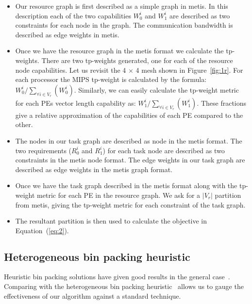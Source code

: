 \begin{itemize}

\item Our resource graph is first described as a simple graph in
  metis. In this description each of the two capabilities $W^i_0$ and
  $W^i_1$ are described as two constraints for each node in the
  graph. The communication bandwidth is described as edge weights in
  metis.

\item Once we have the resource graph in the metis format we calculate
  the tp-weights. There are two tp-weights generated, one for each of
  the resource node capabilities. Let us revisit the 4 $\times$ 4 mesh
  shown in Figure~\ref{fig:1r}. For each processor the MIPS tp-weight is
  calculated by the formula: $W^i_0/\sum_{\forall i \in
    V_r}(W^i_0)$. Similarly, we can easily calculate the tp-weight
  metric for each PEs vector length capability as: $W^i_1/\sum_{\forall
    i \in V_r}(W^i_1)$. These fractions give a relative approximation of
  the capabilities of each PE compared to the other.

\item The nodes in our task graph are described as node in the metis
  format. The two requirements ($R^i_0$ and $R^i_1$) for each task node
  are described as two constraints in the metis node format. The edge
  weights in our task graph are described as edge weights in the metis
  graph format.

\item Once we have the task graph described in the metis format along
  with the tp-weight metric for each PE in the resource graph. We ask
  for a $|V_r|$ partition from metis, giving the tp-weight metric for
  each constraint of the task graph.

\item The resultant partition is then used to calculate the objective in
  Equation~(\ref{eq:2}).

\end{itemize}

\subsection{Heterogeneous bin packing heuristic}
\label{sec:heter-bin-pack}

Heuristic bin packing solutions have given good results in the general
case~\cite{ecof78}. Comparing with the heterogeneous bin packing
heuristic~\cite{mmar11} allows us to gauge the effectiveness of our
algorithm against a standard technique.

